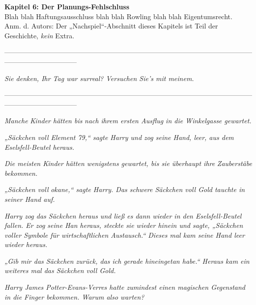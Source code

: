 

\hypertarget{der-planungs-fehlschluss}{%

\textbf{Kapitel 6: Der Planungs-Fehlschluss}\\

\hfill\break Blah blah Haftungsausschluss blah blah Rowling blah blah Eigentumsrecht.\\ Anm. d. Autors: Der „Nachspiel“-Abschnitt dieses Kapitels ist Teil der Geschichte, \emph{kein} Extra.

--------------------------------------------------------------------------------------------------------------------------------------------

\hfill\break

\emph{\emph{Sie denken, Ihr Tag war surreal? Versuchen Sie's mit meinem.}}

\hfill\break

--------------------------------------------------------------------------------------------------------------------------------------------

\hfill\break \emph{\emph{Manche}} \emph{Kinder hätten bis} \emph{\emph{nach}} \emph{ihrem ersten Ausflug in die Winkelgasse gewartet.}

\emph{„Säckchen voll Element 79,“ sagte Harry und zog seine Hand, leer, aus dem Eselsfell-Beutel heraus.}

\emph{Die meisten Kinder hätten wenigstens gewartet, bis sie überhaupt ihre} \emph{\emph{Zauberstäbe}} \emph{bekommen.}

\emph{„Säckchen voll} \emph{\emph{okane,}“ sagte Harry. Das schwere Säckchen voll Gold tauchte in seiner Hand auf.}

\emph{Harry zog das Säckchen heraus und ließ es dann wieder in den Eselsfell-Beutel fallen. Er zog seine Han heraus, steckte sie wieder hinein und sagte, „Säckchen voller Symbole für wirtschaftlichen Austausch.“ Dieses mal kam seine Hand leer wieder heraus.}

\emph{„Gib mir das Säckchen zurück, das ich gerade hineingetan habe.“ Heraus kam ein weiteres mal das Säckchen voll Gold.}

\emph{Harry James Potter-Evans-Verres hatte zumindest einen magischen Gegenstand in die Finger bekommen. Warum also warten?}

}
